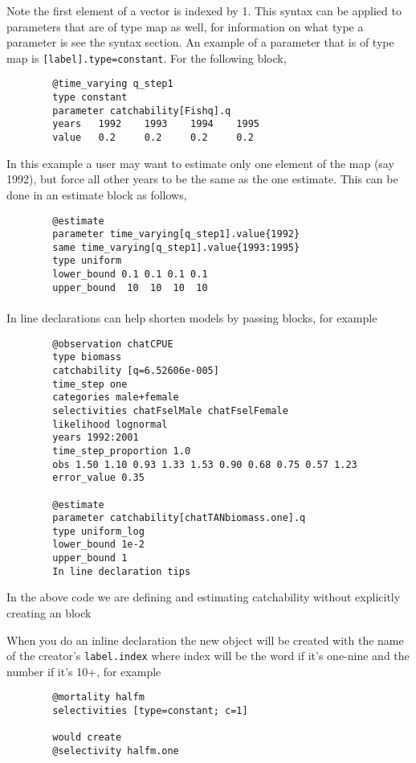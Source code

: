 Note the first element of a vector is indexed by 1. This syntax can be applied to parameters that are of type map as well, for information on what type a parameter is see the syntax section. An example of a parameter that is of type map is \texttt{[label].type=constant}. For the following  block,

{\small{\begin{verbatim}
		@time_varying q_step1
		type constant
		parameter catchability[Fishq].q
		years 	1992	1993	1994	1995
		value 	0.2		0.2		0.2		0.2	
		\end{verbatim}}}

In this example a user may want to estimate only one element of the map (say 1992), but force all other years to be the same as the one estimate. This can be done in an estimate block as follows,
{\small{\begin{verbatim}
		@estimate
		parameter time_varying[q_step1].value{1992}
		same time_varying[q_step1].value{1993:1995}
		type uniform
		lower_bound 0.1 0.1 0.1 0.1
		upper_bound  10  10  10  10 
		\end{verbatim}}}
\paragraph*{\label{sec:declare}}
In line declarations can help shorten models by passing \command{} blocks, for example 
{\small{\begin{verbatim}
		@observation chatCPUE
		type biomass
		catchability [q=6.52606e-005]
		time_step one
		categories male+female
		selectivities chatFselMale chatFselFemale
		likelihood lognormal
		years 1992:2001
		time_step_proportion 1.0
		obs 1.50 1.10 0.93 1.33 1.53 0.90 0.68 0.75 0.57 1.23
		error_value 0.35
		
		@estimate 
		parameter catchability[chatTANbiomass.one].q
		type uniform_log
		lower_bound 1e-2
		upper_bound 1
		In line declaration tips
		\end{verbatim}}}

In the above code we are defining and estimating catchability without explicitly creating an  block


When you do an inline declaration the new object will be created with the name of the creator's \texttt{label.index}
where index will be the word if it's one-nine and the number if it's 10+, for example
{\small{\begin{verbatim}
		@mortality halfm
		selectivities [type=constant; c=1]
		
		would create
		@selectivity halfm.one
		\end{verbatim}}}

